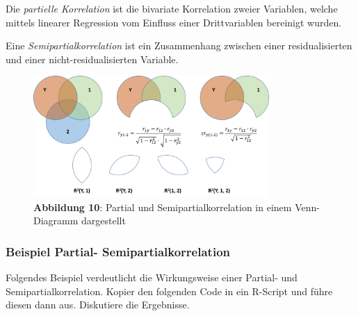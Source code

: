 \documentclass[
]{article}
\begin{document}
Die \emph{partielle Korrelation} ist die bivariate Korrelation zweier Variablen, welche mittels linearer Regression vom Einfluss einer Drittvariablen bereinigt wurden.

Eine \emph{Semipartialkorrelation} ist ein Zusammenhang zwischen einer residualisierten und einer nicht-residualisierten Variable.

\begin{figure}
\centering
\includegraphics[width=0.8\textwidth,height=\textheight]{Images/PartialSemipartialkorrelation.png}
\caption{\textbf{Abbildung 10}: Partial und Semipartialkorrelation in einem Venn-Diagramm dargestellt}
\end{figure}

\subsubsection*{Beispiel Partial- Semipartialkorrelation}\label{beispiel-partial--semipartialkorrelation}

Folgendes Beispiel verdeutlicht die Wirkungsweise einer Partial- und Semipartialkorrelation. Kopier den folgenden Code in ein R-Script und führe diesen dann aus. Diskutiere die Ergebnisse.
\end{document}
